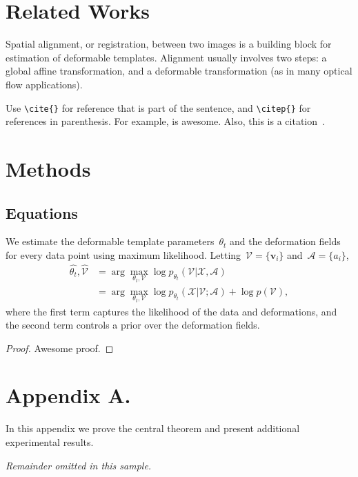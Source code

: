 \documentclass[twoside,11pt]{article}
\begin{document}
\section{Related Works}

Spatial alignment, or registration, between two images is a building block for estimation of deformable templates. Alignment usually involves two steps: a global affine transformation, and a deformable transformation (as in many optical flow applications).

Use \verb|\cite{}| for reference that is part of the sentence, and \verb|\citep{}| for references in parenthesis. For example, \cite{viola1997alignment} is awesome. Also, this is a citation~\citep{viola1997alignment}. 



\section{Methods}

\subsection{Equations}

We estimate the deformable template parameters~$\theta_t$ and the deformation fields for every data point using maximum likelihood. Letting~$\mathcal{V} = \{\boldsymbol{v}_i\}$ and~$\mathcal{A} = \{a_i\}$, 
%
\begin{align}
\hat{\theta_t}, \hat{\mathcal{V}} &= \arg \max_{\theta_t, \mathcal{V}} \log p_{\theta_t}(\mathcal{V} | \mathcal{X},  \mathcal{A}) \nonumber \\
&= \arg \max_{\theta_t, \mathcal{V}} \log p_{\theta_t}(\mathcal{X} | \mathcal{V}; \mathcal{A}) + \log p(\mathcal{V}),
\label{eq:logpost}
\end{align}
%
where the first term captures the likelihood of the data and deformations, and the second term controls a prior over the deformation fields.

\begin{proof}
    Awesome proof.
\end{proof}




\appendix
\section*{Appendix A.}


In this appendix we prove the central theorem and present additional experimental results.
\noindent


{\noindent \em Remainder omitted in this sample. }


\vskip 0.2in

\end{document}
